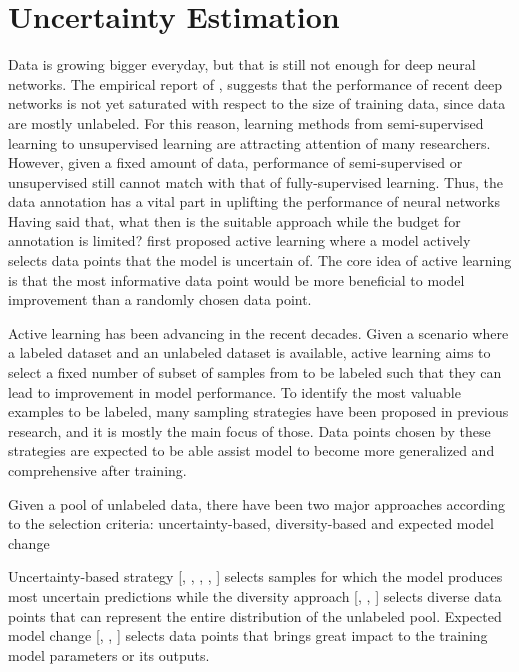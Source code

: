 \section{Uncertainty Estimation}
\label{sec:uncertainty}

Data is growing bigger everyday, but that is still not enough for deep neural networks. The empirical report of \cite{mahajan2018exploring}, \cite{joulin2016learningvisual} suggests that the performance of recent deep networks is not yet saturated with respect to the size of training data, since data are mostly unlabeled. For this reason, learning methods from semi-supervised learning to unsupervised learning are attracting attention of many researchers. However, given a fixed amount of data, performance of semi-supervised or unsupervised still cannot match with that of fully-supervised learning. 
Thus, the data annotation has a vital part in uplifting the performance of neural networks
Having said that, what then is the suitable approach while the budget for annotation is limited?  \cite{atlas1989trainingconnectionist} first proposed active learning where a model actively selects data points that the model is uncertain of. The core idea of active learning is that the most informative data point would be more beneficial to model improvement than a randomly chosen data point.

Active learning has been advancing in the recent decades. Given a scenario where a labeled dataset  and an unlabeled dataset  is available, active learning aims to select a fixed number of subset of samples from  to be labeled such that they can lead to improvement in model performance. To identify the most valuable examples to be labeled, many sampling strategies have been proposed in previous research, and it is mostly the main focus of those. Data points chosen by these strategies are expected to be able assist model to become more generalized and comprehensive after training.

Given a pool of unlabeled data, there have been two major approaches according to the selection criteria: uncertainty-based, diversity-based and expected model change

Uncertainty-based strategy [\cite{joshi2009multi}, \cite{wang2016cost}, \cite{tong2001svmactive}, \cite{seung1992query}, \cite{beluch2018power}] selects samples for which the model produces most uncertain predictions while the diversity approach [\cite{sener2018activelearningforcnn}, \cite{nguyen2004activepreclustering}, \cite{guo2010activeinstance}] selects diverse data points that can represent the entire distribution of the unlabeled pool.
Expected model change [\cite{roy2001toward}, \cite{settles2007multiple}, \cite{freytag2014selecting}] selects data points that brings great impact to the training model parameters or its outputs.

